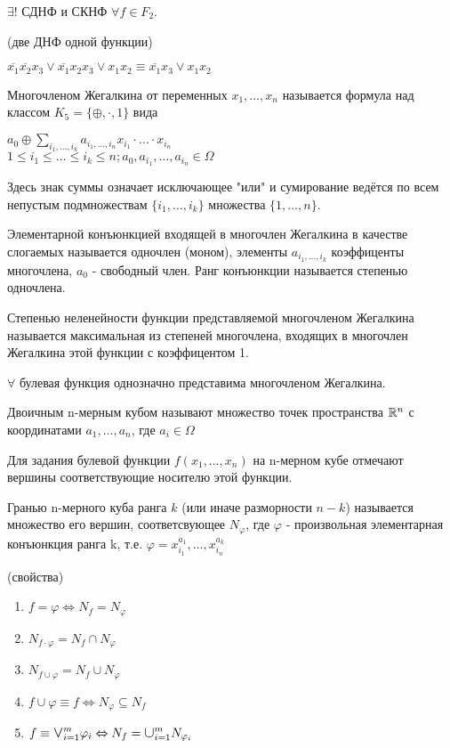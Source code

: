 \utv $\exists!$ СДНФ и СКНФ $\forall f \in F_2$.

\example (две ДНФ одной функции) \par $\overline{x_1}\overline{x_2}x_3 \vee \overline{x_1}x_2x_3 \vee x_1x_2 \equiv \overline{x_1}x_3 \vee x_1x_2$

\opr Многочленом Жегалкина от переменных $x_1, \dotsc, x_n$ называется формула над классом $K_5=\{\oplus, \cdot, 1\}$ вида
\begin{center}
	$a_0 \oplus \sum_{i_1, \dotsc,i_k} a_{i_1, \dotsc, i_n}x_{i_1}\cdot \dotsc \cdot x_{i_n}$\\$1 \leq i_1 \leq \dotsc \leq i_k \leq n; a_0, a_{i_1}, \dotsc, a_{i_n} \in \Omega$
\end{center}
Здесь знак суммы означает исключающее "или" и сумирование ведётся по всем непустым подмножествам $\{i_1, \dotsc, i_k\}$ множества $\{1, \dotsc, n\}$.

\opr Элементарной конъюнкцией входящей в многочлен Жегалкина в качестве слогаемых называется одночлен (моном), элементы $a_{i_1, \dotsc, i_k}$ коэффиценты многочлена, $a_0$ - свободный член. Ранг конъюнкции называется степенью одночлена. \par Степенью неленейности функции представляемой многочленом Жегалкина называется максимальная из степеней многочлена, входящих в многочлен Жегалкина этой функции с коэффицентом 1.

\thr $\forall$ булевая функция однозначно представима многочленом Жегалкина.

\opr Двоичным n-мерным кубом называют множество точек пространства $\mathbb{R}^n$ с координатами $a_1, \dotsc, a_n$, где $a_i \in \Omega$

Для задания булевой функции $f(x_1,\dotsc,x_n)$ на n-мерном кубе отмечают вершины соответствующие носителю этой функции.

\opr Гранью n-мерного куба ранга $k$ (или иначе разморности $n-k$) называется множество его вершин, соответсвующее $N_{\varphi}$, где $\varphi$ - произвольная элементарная конъюнкция ранга k, т.е. $\varphi = x_{i_1}^{a_1}, \dotsc, x_{i_n}^{a_k}$

\utv(свойства)
\begin{enumerate} 
	\item $f = \varphi \Leftrightarrow N_f = N_{\varphi}$
	\item $N_{f \cdot \varphi} = N_f \cap N_{\varphi}$
	\item $N_{f \cup \varphi} = N_f \cup N_{\varphi}$
	\item $f \cup \varphi \equiv f \Leftrightarrow N_{\varphi}\subseteq N_f$
	\item $f \equiv \mathlarger{\mathlarger{\vee}} _{i=1}^m\varphi_i \Leftrightarrow N_f = \mathlarger{\mathlarger{\cup}} _{i=1}^mN_{\varphi_i}$
\end{enumerate}

